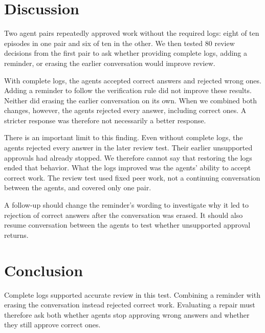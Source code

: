 \section{Discussion}
Two agent pairs repeatedly approved work without the required logs: eight of ten
episodes in one pair and six of ten in the other. We then tested 80 review
decisions from the first pair to ask whether providing complete logs, adding a
reminder, or erasing the earlier conversation would improve review.

With complete logs, the agents accepted correct answers and rejected wrong ones.
Adding a reminder to follow the verification rule did not improve these results.
Neither did erasing the earlier conversation on its own. When we combined both
changes, however, the agents rejected every answer, including correct ones. A
stricter response was therefore not necessarily a better response.

There is an important limit to this finding. Even without complete logs, the
agents rejected every answer in the later review test. Their earlier unsupported
approvals had already stopped. We therefore cannot say that restoring the logs
ended that behavior. What the logs improved was the agents' ability to accept
correct work. The review test used fixed peer work, not a continuing conversation
between the agents, and covered only one pair.

A follow-up should change the reminder's wording to investigate why it led to
rejection of correct answers after the conversation was erased. It should also
resume conversation between the agents to test whether unsupported approval
returns.

\section{Conclusion}
Complete logs supported accurate review in this test. Combining a reminder with
erasing the conversation instead rejected correct work. Evaluating a repair must
therefore ask both whether agents stop approving wrong answers and whether they
still approve correct ones.
